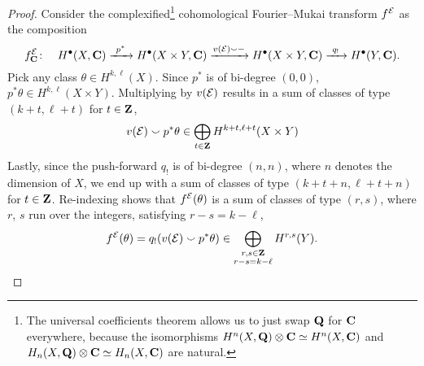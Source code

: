 \begin{proof}
    Consider the complexified\footnote{
        The universal coefficients theorem allows us to just swap $\mathbf Q$ for $\mathbf C$ everywhere, because the isomorphisms $H^{n}(X, \mathbf Q)\otimes \mathbf C \simeq H^{n}(X, \mathbf C)$ and $H_n(X, \mathbf Q)\otimes \mathbf C \simeq H_n(X, \mathbf C)$ are natural. 
    } cohomological Fourier--Mukai transform $f^{\mathcal E}$ as the composition
    \[  
        f^{\mathcal E}_\mathbf C \colon \quad H^{\bullet}(X, \mathbf C) \xrightarrow{\ p^* \ } H^{\bullet}(X \times Y, \mathbf C) \xrightarrow{v(\mathcal E) \smallsmile -} H^{\bullet}(X \times Y, \mathbf C) \xrightarrow{\ q_! \ } H^{\bullet}(Y, \mathbf C).
    \]
    Pick any class $\theta \in H^{k, \ell}(X)$. Since $p^*$ is of bi-degree $(0,0)$, $p^*\theta \in H^{k,\ell}(X \times Y)$. Multiplying by $v(\mathcal E)$ results in a sum of classes of type $(k + t, \ell + t)$ for $t \in \mathbf Z$, \ie
    \[
        v(\mathcal E) \smallsmile p^*\theta \in \bigoplus_{t \in \mathbf Z}H^{k + t, \ell + t}(X \times Y)
    \]
    Lastly, since the push-forward $q_!$ is of bi-degree $(n,n)$, where $n$ denotes the dimension of $X$, we end up with a sum of classes of type $(k + t + n, \ell + t + n)$ for $t \in \mathbf Z$. Re-indexing shows that $f^{\mathcal E}(\theta)$ is a sum of classes of type $(r,s)$, where $r$, $s$ run over the integers, satisfying $r - s = k - \ell$, \ie
    \[
        f^{\mathcal E}(\theta) = q_!(v(\mathcal E) \smallsmile p^*\theta) \in \bigoplus_{\substack{r,s\in \mathbf Z \\ r-s = k - \ell}}H^{r,s}(Y). \qedhere
    \]
\end{proof}